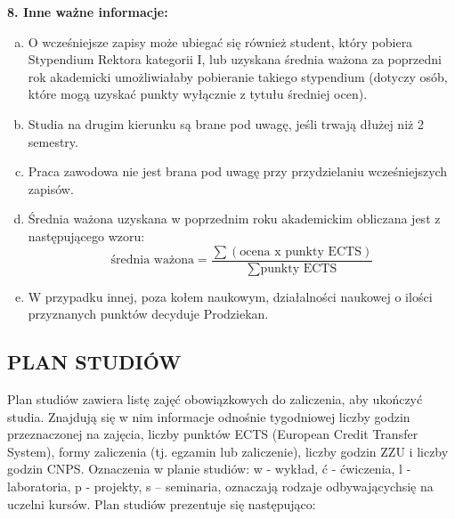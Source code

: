 \documentclass[11pt]{article}
\begin{document}
\textbf{8. Inne ważne informacje:}
\begin{enumerate}[a)]
    \item O wcześniejsze zapisy może ubiegać się również student, który pobiera Stypendium Rektora kategorii I, lub uzyskana średnia ważona za poprzedni rok akademicki umożliwiałaby pobieranie takiego stypendium (dotyczy osób, które mogą uzyskać punkty wyłącznie z tytułu średniej ocen).
    \item Studia na drugim kierunku są brane pod uwagę, jeśli trwają dłużej niż 2 semestry.
    \item Praca zawodowa nie jest brana pod uwagę przy przydzielaniu wcześniejszych zapisów.
    \item Średnia ważona uzyskana w poprzednim roku akademickim obliczana jest z następującego wzoru: 
    \begin{equation*}
        \mbox{średnia ważona}=\frac{\sum (\mbox{ocena x punkty ECTS})}{\sum \mbox{punkty ECTS} }
    \end{equation*}
    \item W przypadku innej, poza kołem naukowym, działalności naukowej o ilości przyznanych punktów decyduje Prodziekan.
\end{enumerate}




\subsection{PLAN STUDIÓW}
\indent \hspace{0.5cm} Plan studiów zawiera listę zajęć obowiązkowych do zaliczenia, aby ukończyć studia. Znajdują się w nim informacje odnośnie tygodniowej liczby godzin przeznaczonej na zajęcia, liczby punktów ECTS (European Credit Transfer System), formy zaliczenia (tj. egzamin lub zaliczenie), liczby godzin ZZU i liczby godzin CNPS. Oznaczenia w planie studiów: w - wykład, ć - ćwiczenia, l - laboratoria, p - projekty, s – seminaria, oznaczają rodzaje odbywających\linebreak się na uczelni kursów. Plan studiów prezentuje się następująco:\\

\end{document}
